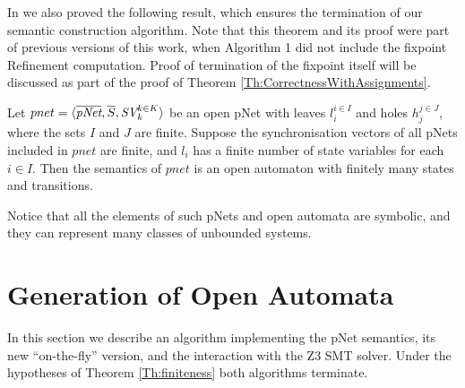 \documentclass[smallcondensed]{svjour3}
\newcommand{\noteSB}[2][color=green!40, size=\tiny]{\todo[#1]{{\bf Simon: } {#2}}}
\newcommand{\noteEM}[2][color=blue!40, size=\tiny]{\todo[#1]{{\bf Eric: } {#2}}}
\newcommand{\ie}[1][\ ]{i.e.#1}
\begin{document}
In \cite{henrio:Forte2016} we also proved the following result, which
ensures the termination of our semantic construction algorithm.
Note that this theorem and its proof were part of previous versions of this work, when Algorithm 1 did not include the fixpoint Refinement computation. Proof of termination of the fixpoint itself will be discussed as part of the proof of Theorem \ref{Th:CorrectnessWithAssignments}.

  
\begin{theorem}[Finiteness]
  \label{Th:finiteness}
   Let $pnet=\langle \overline{\pNet},\overline{S}, \symb{SV}_k^{k\in K}\rangle$ be an open pNet  with leaves $l_i^{i\in I}$ and holes $h_j^{j\in
 	J}$, where the sets $I$ and $J$ are finite. Suppose the synchronisation vectors of all pNets 
 included in  $pnet$   are finite, and 
 $l_i $ has a finite number of state variables for each $i\in I$. Then the semantics of $pnet$ is an open automaton 
 with finitely many states and transitions.
\end{theorem}
Notice that all the elements of such pNets and open automata are symbolic, and they can represent many classes of unbounded systems. 


\section{Generation of Open Automata}
\label{section:implementation}
In this section we describe an algorithm implementing the pNet
semantics, its new ``on-the-fly'' version, and the interaction with the
Z3 SMT solver. Under the hypotheses of Theorem \ref{Th:finiteness} 
both algorithms terminate. 

\end{document}
